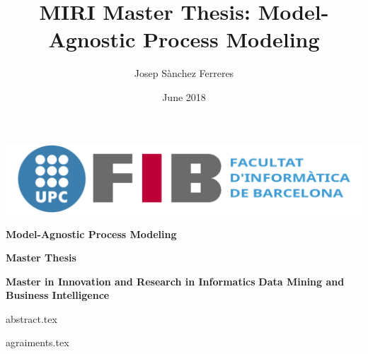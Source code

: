\documentclass[10pt,a4paper]{report}
\title{MIRI Master Thesis: Model-Agnostic Process Modeling}
\author{Josep Sànchez Ferreres}
\date{June 2018}
\newcommand\blankpage{%
    \null
    \thispagestyle{empty}%
    \addtocounter{page}{-1}%
    \newpage}
\begin{document}
\begin{titlepage}

    \begin{center}
        \huge
        
        \includegraphics[width=\textwidth, height=0.1981\textwidth]{figures/logo3}

        \vspace{3.5cm}

        \textbf{Model-Agnostic Process Modeling}

        \vspace{3cm}

        \textbf{Master Thesis}

        \vspace{1.8cm}

        {\Large
        \textbf{Master in Innovation and Research in Informatics}
        \vspace{1cm}
        \textbf{Data Mining and Business Intelligence}
        }

        \vfill
        

        \vspace{1cm}
        
    \end{center}
    
\end{titlepage}

\blankpage

{abstract.tex}
\clearpage

{agraiments.tex}

\tableofcontents

\begingroup
\makeatletter
\end{document}
